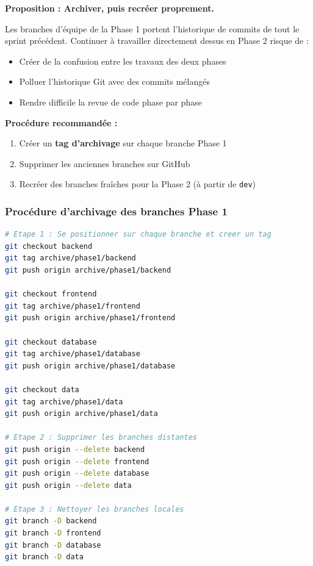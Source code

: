 \documentclass[11pt,a4paper]{article}
\begin{document}
\begin{decision}
\textbf{Proposition : Archiver, puis recréer proprement.}

\vspace{0.3cm}
Les branches d'équipe de la Phase 1 portent l'historique de commits de tout le sprint précédent. Continuer à travailler directement dessus en Phase 2 risque de :
\begin{itemize}
    \item[\ding{56}] Créer de la confusion entre les travaux des deux phases
    \item[\ding{56}] Polluer l'historique Git avec des commits mélangés
    \item[\ding{56}] Rendre difficile la revue de code phase par phase
\end{itemize}

\vspace{0.3cm}
\textbf{Procédure recommandée :}
\begin{enumerate}
    \item Créer un \textbf{tag d'archivage} sur chaque branche Phase 1
    \item Supprimer les anciennes branches sur GitHub
    \item Recréer des branches fraîches pour la Phase 2 (à partir de \texttt{dev})
\end{enumerate}
\end{decision}

\subsubsection{Procédure d'archivage des branches Phase 1}

\begin{lstlisting}[language=bash, caption=Archivage des branches Phase 1 avant suppression]
# Etape 1 : Se positionner sur chaque branche et creer un tag
git checkout backend
git tag archive/phase1/backend
git push origin archive/phase1/backend

git checkout frontend
git tag archive/phase1/frontend
git push origin archive/phase1/frontend

git checkout database
git tag archive/phase1/database
git push origin archive/phase1/database

git checkout data
git tag archive/phase1/data
git push origin archive/phase1/data

# Etape 2 : Supprimer les branches distantes
git push origin --delete backend
git push origin --delete frontend
git push origin --delete database
git push origin --delete data

# Etape 3 : Nettoyer les branches locales
git branch -D backend
git branch -D frontend
git branch -D database
git branch -D data
\end{lstlisting}
\end{document}
